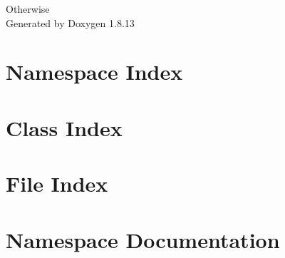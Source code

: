 \documentclass[twoside]{book}
\newcommand{\+}{\discretionary{\mbox{\scriptsize$\hookleftarrow$}}{}{}}
\newcommand{\clearemptydoublepage}{%
  \newpage{\pagestyle{empty}\cleardoublepage}%
}
\begin{document}
\hypersetup{pageanchor=false,
             bookmarksnumbered=true,
             pdfencoding=unicode
            }
\begin{titlepage}
\vspace*{7cm}
\begin{center}%
{\Large Otherwise }\\
\vspace*{1cm}
{\large Generated by Doxygen 1.8.13}\\
\end{center}
\end{titlepage}
\clearemptydoublepage
{}
\tableofcontents
\clearemptydoublepage
{}
\hypersetup{pageanchor=true}

\chapter{Namespace Index}

\chapter{Class Index}

\chapter{File Index}

\chapter{Namespace Documentation}

\end{document}
